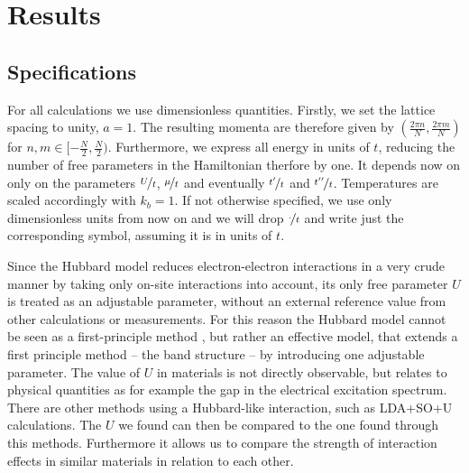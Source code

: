 
 
\chapter{Results}

\section{Specifications} %

For all calculations we use dimensionless quantities. 
Firstly, we set the lattice spacing to unity, $a=1$. 
The resulting momenta are therefore given by $(\frac{2\pi n}{N},\frac{2\pi m}{N})$ for $n,m \in [-\frac N2, \frac N2)$.
Furthermore, we express all energy in units of $t$, reducing the number of free parameters in the Hamiltonian therfore by one.
It depends now on only on the parameters $\nicefrac Ut$, $\nicefrac {\mu}t$ and eventually $\nicefrac{t^{\prime}}t$ and $\nicefrac{t^{\prime \prime}}t$.
Temperatures are scaled accordingly with $k_b=1$.
If not otherwise specified, we use only dimensionless units from now on and we will drop $\nicefrac{\cdot}{t}$ and write just the corresponding symbol, 
assuming it is in units of $t$.


Since the Hubbard model reduces electron-electron interactions in a very crude manner by taking only on-site interactions into account,
its only free parameter $U$ is treated as an adjustable parameter, without an external reference value from other calculations or measurements.	
For this reason the Hubbard model cannot be seen as a first-principle method \cite{J.Phys.Cond.Matter.Vol21.34},
but rather an effective model, that extends a first principle method – the band structure – by introducing one adjustable parameter.
The value of $U$ in materials is not directly observable, but relates to physical quantities as for example the gap in the electrical excitation spectrum.
There are other methods using a Hubbard-like interaction, such as LDA+SO+U calculations.
The $U$ we found can then be compared to the one found through this methods. 
Furthermore it allows us to compare the strength of interaction effects in similar materials in relation to each other.


